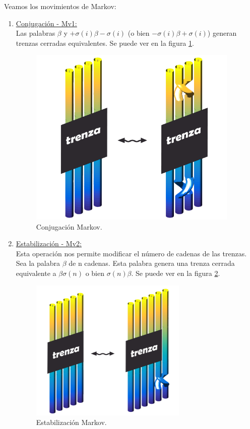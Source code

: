 \documentclass[14pt]{extarticle}
\begin{document}
Veamos los movimientos de Markov:
\begin{enumerate}
	\item \underline{Conjugación - Mv1:} \\
	Las palabras $\beta$ y $+\sigma(i) \beta -\sigma(i)$ (o bien  $-\sigma(i) \beta +\sigma(i)$) generan trenzas cerradas equivalentes. Se puede ver en la figura \ref{tren11}.
	\begin{figure}[h!]
		\centering
		\includegraphics[width=10cm]{itrenzas/M4.png}
		\caption{Conjugación Markov.}
		\label{tren11} 
	\end{figure}
	
	\item \underline{Estabilización - Mv2:} \\
	Esta operación nos permite modificar el número de cadenas de las trenzas. 
	Sea la palabra $\beta$ de n cadenas. Esta palabra genera una trenza cerrada equivalente a $\beta \sigma(n)$ o bien $\sigma(n) \beta $. Se puede ver en la figura \ref{tren12}.
	\begin{figure}[h!]
		\centering
		\includegraphics[width=7.5cm]{itrenzas/M5.png}
		\caption{Estabilización Markov.}
		\label{tren12} 
	\end{figure}
	
\end{enumerate}
\end{document}
